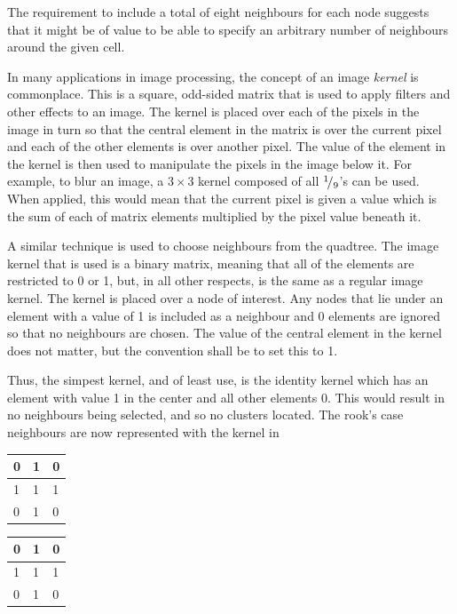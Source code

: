 The requirement to include a total of eight neighbours for each node suggests
that it might be of value to be able to specify an arbitrary number of
neighbours around the given cell.

In many applications in image processing, the concept of an image \emph{kernel}
is commonplace. This is a square, odd-sided matrix that is used to apply
filters and other effects to an image. The kernel is placed over each of the
pixels in the image in turn so that the central element in the matrix is over
the current pixel and each of the other elements is over another pixel. The
value of the element in the kernel is then used to manipulate the pixels in the
image below it. For example, to blur an image, a $3\times 3$ kernel composed of
all ${}^{1}\!/_{9}$'s can be used. When applied, this would mean that the
current pixel is given a value which is the sum of each of matrix elements
multiplied by the pixel value beneath it.

A similar technique is used to choose neighbours from the quadtree. The image
kernel that is used is a binary matrix, meaning that all of the elements are
restricted to 0 or 1, but, in all other respects, is the same as a regular
image kernel. The kernel is placed over a node of interest. Any nodes that lie
under an element with a value of 1 is included as a neighbour and 0 elements
are ignored so that no neighbours are chosen. The value of the central element
in the kernel does not matter, but the convention shall be to set this to 1.

Thus, the simpest kernel, and of least use, is the identity kernel which has an
element with value 1 in the center and all other elements 0. This would result
in no neighbours being selected, and so no clusters located. The rook's case
neighbours are now represented with the kernel in

\begin{table}[h!]
	\centering
	\begin{tabular}{|l|l|l|}
		\hline
		0 & 1 & 0 \\
		\hline
		1 & \cellcolor{lblue}1 & 1 \\
		\hline
		0 & 1 & 0 \\
		\hline
	\end{tabular}
	\qquad
	\begin{tabular}{|l|l|l|}
		\hline
		0 & 1 & 0 \\
		\hline
		1 & \cellcolor{lblue}1 & 1 \\
		\hline
		0 & 1 & 0 \\
		\hline
	\end{tabular}
\end{table}


